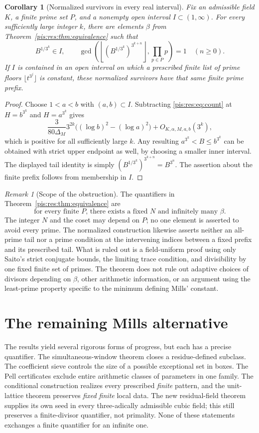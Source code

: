\documentclass[11pt,a4paper]{article}
\newtheorem{corollary}[theorem]{Corollary}
\theoremstyle{definition}\newtheorem{definition}[theorem]{Definition}
\theoremstyle{remark}\newtheorem{remark}[theorem]{Remark}
\begin{document}
\begin{corollary}[Normalized survivors in every real interval]
\label{pis:res:cor:normalized}
Fix an admissible field $K$, a finite prime set $P$, and a nonempty
open interval $I\subset(1,\infty)$. For every sufficiently large
integer $k$, there are elements $\beta$ from
Theorem~\ref{pis:res:thm:equivalence} such that
\[
 B^{1/3^k}\in I,
 \qquad
 \gcd\left(\left\lfloor
    (B^{1/3^k})^{3^{k+n}}\right\rfloor,
    \prod_{p\in P}p\right)=1\quad(n\ge0).
\]
If $I$ is contained in an open interval on which a prescribed finite
list of prime floors $\lfloor t^{3^j}\rfloor$ is constant, these
normalized survivors have that same finite prime prefix.
\end{corollary}
\begin{proof}
Choose $1<a<b$ with $(a,b)\subset I$. Subtracting
\eqref{pis:res:eq:count} at $H=b^{3^k}$ and $H=a^{3^k}$ gives
\[
 \frac{3}{80\Delta_M}3^{2k}
       \bigl((\log b)^2-(\log a)^2\bigr)+O_{K,\alpha,M,a,b}(3^k),
\]
which is positive for all sufficiently large $k$. Any resulting
$a^{3^k}<B\le b^{3^k}$ can be obtained with strict upper endpoint
as well, by choosing a smaller inner interval. The displayed tail
identity is simply
$(B^{1/3^k})^{3^{k+n}}=B^{3^n}$. The assertion about the finite
prefix follows from membership in $I$.
\end{proof}

\begin{remark}[Scope of the obstruction]
\label{pis:res:rem:scope}
The quantifiers in Theorem~\ref{pis:res:thm:equivalence} are
\[
 \text{for every finite }P\text{, there exists a fixed }N
 \text{ and infinitely many }\beta.
\]
The integer $N$ and the coset may depend on $P$; no one element
is asserted to avoid every prime. The normalized construction
likewise asserts neither an all-prime tail nor a prime condition
at the intervening indices between a fixed prefix and its prescribed
tail. What is ruled out is a field-uniform proof using only
Saito's strict conjugate bounds, the limiting trace condition, and
divisibility by one fixed finite set of primes. The theorem does not
rule out adaptive choices of divisors depending on $\beta$, other
arithmetic information, or an argument using the least-prime property
specific to the minimum defining Mills' constant.
\end{remark}


\section{The remaining Mills alternative}
The results yield several rigorous forms of progress, but each has
a precise quantifier. The simultaneous-window theorem closes a
residue-defined subclass. The coefficient sieve controls the size
of a possible exceptional set in boxes. The Pell certificates
exclude entire arithmetic classes of parameters in one family.
The conditional construction realizes every prescribed \emph{finite}
pattern, and the unit-lattice theorem preserves \emph{fixed finite}
local data. The new residual-field theorem supplies its own seed
in every three-adically admissible cubic field; this still preserves
a finite-divisor quantifier, not primality. None of these statements exchanges a finite quantifier
for an infinite one.
\end{document}

